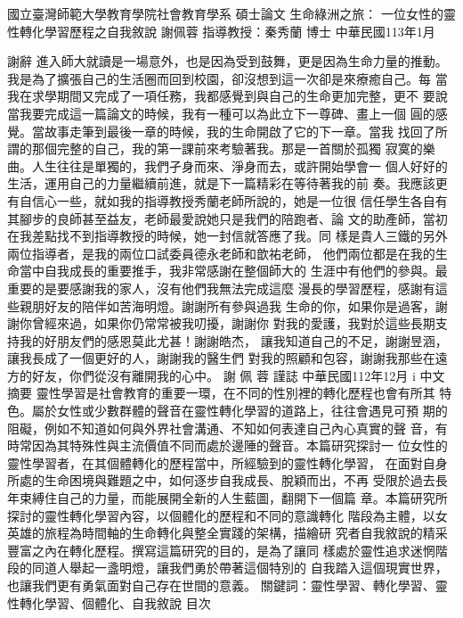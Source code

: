 國立臺灣師範大學教育學院社會教育學系 
碩士論文 
生命綠洲之旅： 
一位女性的靈性轉化學習歷程之自我敘說 
謝佩蓉 
指導教授：秦秀蘭 博士 
中華民國113年1月 
 
 
  
謝辭 
進入師大就讀是一場意外，也是因為受到鼓舞，更是因為生命力量的推動。
我是為了擴張自己的生活圈而回到校園，卻沒想到這一次卻是來療癒自己。每
當我在求學期間又完成了一項任務，我都感覺到與自己的生命更加完整，更不
要說當我要完成這一篇論文的時候，我有一種可以為此立下一尊碑、畫上一個
圓的感覺。當故事走筆到最後一章的時候，我的生命開啟了它的下一章。當我
找回了所謂的那個完整的自己，我的第一課前來考驗著我。那是一首關於孤獨
寂寞的樂曲。人生往往是單獨的，我們孑身而來、淨身而去，或許開始學會一
個人好好的生活，運用自己的力量繼續前進，就是下一篇精彩在等待著我的前
奏。我應該更有自信心一些，就如我的指導教授秀蘭老師所說的，她是一位很
信任學生各自有其腳步的良師甚至益友，老師最愛說她只是我們的陪跑者、論
文的助產師，當初在我差點找不到指導教授的時候，她一封信就答應了我。同
樣是貴人三鐵的另外兩位指導者，是我的兩位口試委員德永老師和歆祐老師，
他們兩位都是在我的生命當中自我成長的重要推手，我非常感謝在整個師大的
生涯中有他們的參與。最重要的是要感謝我的家人，沒有他們我無法完成這麼
漫長的學習歷程，感謝有這些親朋好友的陪伴如苦海明燈。謝謝所有參與過我
生命的你，如果你是過客，謝謝你曾經來過，如果你仍常常被我叨擾，謝謝你
對我的愛護，我對於這些長期支持我的好朋友們的感恩莫此尤甚！謝謝皓杰，
讓我知道自己的不足，謝謝昱涵，讓我長成了一個更好的人，謝謝我的醫生們
對我的照顧和包容，謝謝我那些在遠方的好友，你們從沒有離開我的心中。 
謝 佩 蓉 謹誌 
中華民國112年12月 
i 
中文摘要 
靈性學習是社會教育的重要一環，在不同的性別裡的轉化歷程也會有所其
特色。屬於女性或少數群體的聲音在靈性轉化學習的道路上，往往會遇見可預
期的阻礙，例如不知道如何與外界社會溝通、不知如何表達自己內心真實的聲
音，有時常因為其特殊性與主流價值不同而處於邊陲的聲音。本篇研究探討一
位女性的靈性學習者，在其個體轉化的歷程當中，所經驗到的靈性轉化學習，
在面對自身所處的生命困境與難題之中，如何逐步自我成長、脫穎而出，不再
受限於過去長年束縛住自己的力量，而能展開全新的人生藍圖，翻開下一個篇
章。本篇研究所探討的靈性轉化學習內容，以個體化的歷程和不同的意識轉化
階段為主體，以女英雄的旅程為時間軸的生命轉化與整全實踐的架構，描繪研
究者自我敘說的精采豐富之內在轉化歷程。撰寫這篇研究的目的，是為了讓同
樣處於靈性追求迷惘階段的同道人舉起一盞明燈，讓我們勇於帶著這個特別的
自我踏入這個現實世界，也讓我們更有勇氣面對自己存在世間的意義。 
關鍵詞：靈性學習、轉化學習、靈性轉化學習、個體化、自我敘說 
目次 
 
